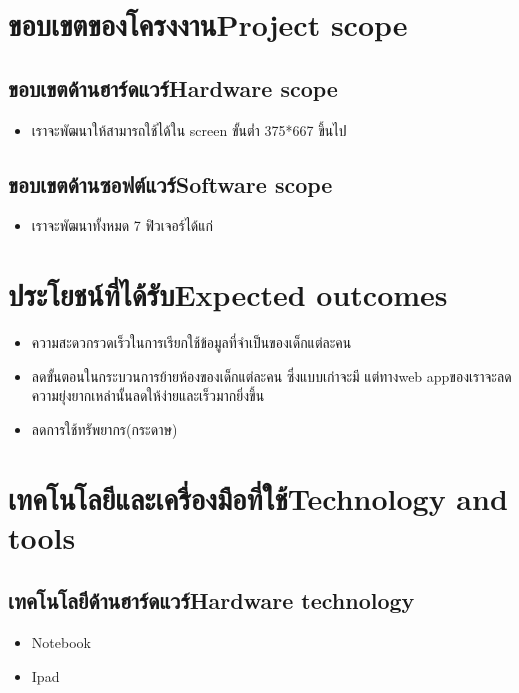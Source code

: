 \section{\ifcpe ขอบเขตของโครงงาน\else Project scope\fi}

\subsection{\ifcpe ขอบเขตด้านฮาร์ดแวร์\else Hardware scope\fi}
\begin{itemize}
    \item เราจะพัฒนาให้สามารถใช้ได้ใน screen ขั้นต่ำ 375*667 ขึ้นไป 
\end{itemize}

\subsection{\ifcpe ขอบเขตด้านซอฟต์แวร์\else Software scope\fi}
\begin{itemize}
    \item เราจะพัฒนาทั้งหมด 7 ฟิวเจอร์ได้แก่ 
\end{itemize}

\section{\ifcpe ประโยชน์ที่ได้รับ\else Expected outcomes\fi}
\begin{itemize}
\item ความสะดวกรวดเร็วในการเรียกใช้ข้อมูลที่จำเป็นของเด็กแต่ละคน
\item ลดขั้นตอนในกระบวนการย้ายห้องของเด็กแต่ละคน ซึ่งแบบเก่าจะมี
 แต่ทางweb appของเราจะลดความยุ่งยากเหล่านั้นลดให้ง่ายและเร็วมากยิ่งขึ้น
 \item ลดการใช้ทรัพยากร(กระดาษ)

\end{itemize}

\section{\ifcpe เทคโนโลยีและเครื่องมือที่ใช้\else Technology and tools\fi}

\subsection{\ifcpe เทคโนโลยีด้านฮาร์ดแวร์\else Hardware technology\fi}
\begin{itemize}
    \item Notebook
    \item Ipad
\end{itemize}

